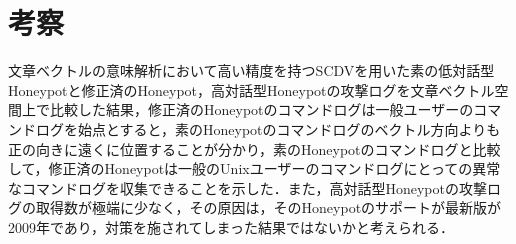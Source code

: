 \section{考察}
\label{eval:implkosatu}
文章ベクトルの意味解析において高い精度を持つ\cite{scdv}SCDVを用いた素の低対話型Honeypotと修正済のHoneypot，高対話型Honeypotの攻撃ログを文章ベクトル空間上で比較した結果，修正済のHoneypotのコマンドログは一般ユーザーのコマンドログを始点とすると，素のHoneypotのコマンドログのベクトル方向よりも正の向きに遠くに位置することが分かり，素のHoneypotのコマンドログと比較して，修正済のHoneypotは一般のUnixユーザーのコマンドログにとっての異常なコマンドログを収集できることを示した．また，高対話型Honeypotの攻撃ログの取得数が極端に少なく，その原因は，そのHoneypotのサポートが最新版が2009年であり，対策を施されてしまった結果ではないかと考えられる．









